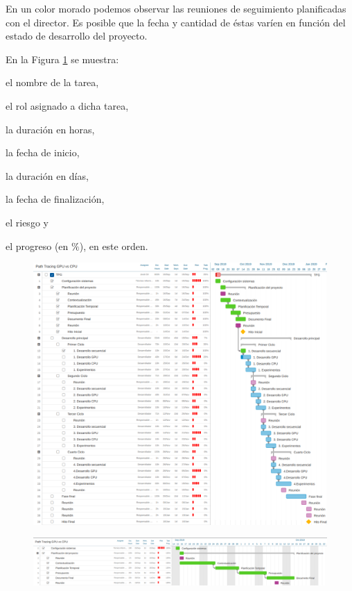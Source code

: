 \documentclass[titlepage,12pt]{report}
\begin{document}
En un color morado podemos observar las reuniones de seguimiento planificadas con el director. Es posible que la fecha y cantidad de éstas varíen en función del estado de desarrollo del proyecto. 

En la Figura \ref{gantt} se muestra: \begin{enumerate*}[label=\roman*)]
\item el nombre de la tarea, \item el rol asignado a dicha tarea, \item la duración en horas, \item la fecha de inicio, \item la duración en días, \item la fecha de finalización, \item el riesgo y \item el progreso (en $\%$), en este orden. \end{enumerate*}

\begin{figure}[H]
	\centering
	\includegraphics[scale=1.45]{media/final_gantt.png}
	\label{gantt}
\end{figure}

\uselandscape

\begin{figure}[H]
	\centering
  	\includegraphics[scale=1.5]{media/final_gantt_1.png}
  	\label{gantt_1}
\end{figure}
\end{document}

